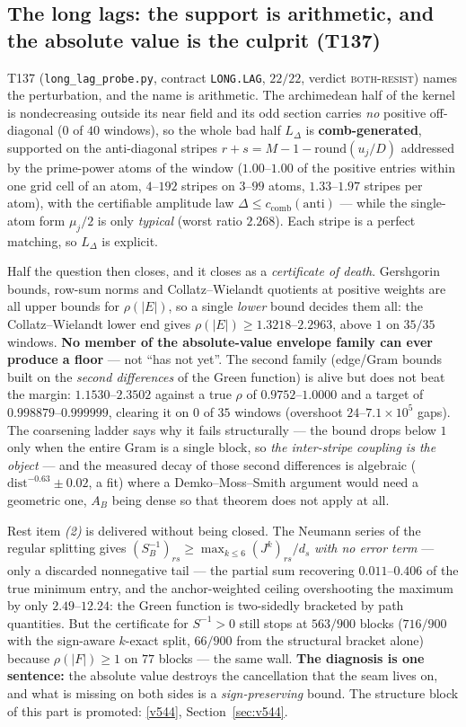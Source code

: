 \documentclass[11pt,a4paper]{article}
\begin{document}
\subsection{The long lags: the support is arithmetic, and the absolute value is the culprit (T137)}
T137 (\texttt{long\_lag\_probe.py}, contract \texttt{LONG.LAG}, $22/22$, verdict
\textsc{both-resist}) names the perturbation, and the name is arithmetic. The archimedean half of the
kernel is nondecreasing outside its near field and its odd section carries \emph{no} positive
off-diagonal ($0$ of $40$ windows), so the whole bad half $L_\Delta$ is \textbf{comb-generated},
supported on the anti-diagonal stripes $r+s=M-1-\mathrm{round}(u_j/D)$ addressed by the prime-power
atoms of the window ($1.00$--$1.00$ of the positive entries within one grid cell of an atom, $4$--$192$
stripes on $3$--$99$ atoms, $1.33$--$1.97$ stripes per atom), with the certifiable amplitude law
$\Delta\le c_{\mathrm{comb}}(\mathrm{anti})$ --- while the single-atom form $\mu_j/2$ is only
\emph{typical} (worst ratio $2.268$). Each stripe is a perfect matching, so $L_\Delta$ is explicit.

Half the question then closes, and it closes as a \emph{certificate of death}. Gershgorin bounds,
row-sum norms and Collatz--Wielandt quotients at positive weights are all upper bounds for
$\rho(|E|)$, so a single \emph{lower} bound decides them all: the Collatz--Wielandt lower end gives
$\rho(|E|)\ge1.3218$--$2.2963$, above $1$ on $35/35$ windows. \textbf{No member of the
absolute-value envelope family can ever produce a floor} --- not ``has not yet''. The second family
(edge/Gram bounds built on the \emph{second differences} of the Green function) is alive but does not
beat the margin: $1.1530$--$2.3502$ against a true $\rho$ of $0.9752$--$1.0000$ and a target of
$0.998879$--$0.999999$, clearing it on $0$ of $35$ windows (overshoot $24$--$7.1\times10^{5}$ gaps).
The coarsening ladder says why it fails structurally --- the bound drops below $1$ only when the entire
Gram is a single block, so \emph{the inter-stripe coupling is the object} --- and the measured decay of
those second differences is algebraic ($\mathrm{dist}^{-0.63}\pm0.02$, a fit) where a
Demko--Moss--Smith argument would need a geometric one, $A_B$ being dense so that theorem does not
apply at all.

Rest item \emph{(2)} is delivered without being closed. The Neumann series of the regular splitting
gives $(S_B^{-1})_{rs}\ge\max_{k\le6}(J^k)_{rs}/d_s$ \emph{with no error term} --- only a discarded
nonnegative tail --- the partial sum recovering $0.011$--$0.406$ of the true minimum entry, and the
anchor-weighted ceiling overshooting the maximum by only $2.49$--$12.24$: the Green function is
two-sidedly bracketed by path quantities. But the certificate for $S^{-1}>0$ still stops at $563/900$
blocks ($716/900$ with the sign-aware $k$-exact split, $66/900$ from the structural bracket alone)
because $\rho(|F|)\ge1$ on $77$ blocks --- the same wall. \textbf{The diagnosis is one sentence:} the
absolute value destroys the cancellation that the seam lives on, and what is missing on both sides is
a \emph{sign-preserving} bound. The structure block of this part is promoted: \vref{v544},
Section~\ref{sec:v544}.
\end{document}
